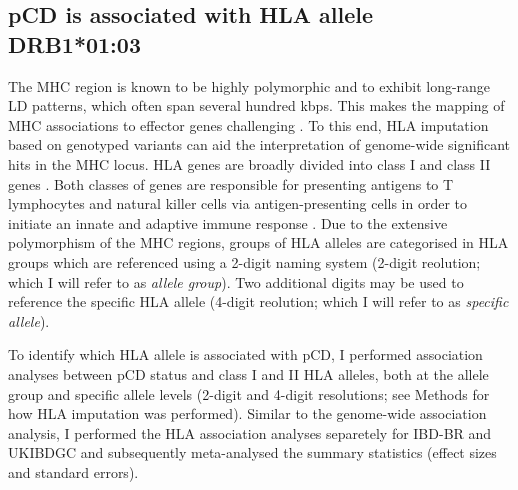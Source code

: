 \subsection{pCD is associated with HLA allele DRB1*01:03}
The MHC region is known to be highly polymorphic and to exhibit long-range LD patterns, which often span several hundred kbps. This makes the mapping of MHC associations to effector genes challenging \cite{Matzaraki2017-za}. To this end, HLA imputation based on genotyped variants can aid the interpretation of genome-wide significant hits in the MHC locus. HLA genes are broadly divided into class I and class II genes \cite{Marsh2010-mq}. Both classes of genes are responsible for presenting antigens to T lymphocytes and natural killer cells via antigen-presenting cells in order to initiate an innate and adaptive immune response \cite{Shiina2009-wt}. Due to the extensive polymorphism of the MHC regions, groups of HLA alleles are categorised in HLA groups which are referenced using a 2-digit naming system \cite{hla-nomenclature} (2-digit reolution; which I will refer to as \textit{allele group}). Two additional digits may be used to reference the specific HLA allele \cite{hla-nomenclature-4digit} (4-digit reolution; which I will refer to as \textit{specific allele}). 

To identify which HLA allele is associated with pCD, I performed association analyses between pCD status and class I and II HLA alleles, both at the allele group and specific allele levels (2-digit and 4-digit resolutions; see Methods for how HLA imputation was performed). Similar to the genome-wide association analysis, I performed the HLA association analyses separetely for IBD-BR and UKIBDGC and subsequently meta-analysed the summary statistics (effect sizes and standard errors). \\

